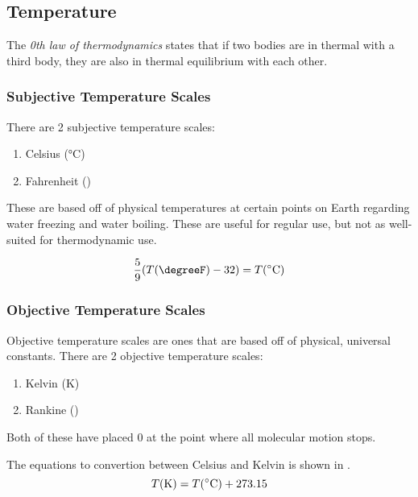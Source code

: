 \subsection{Temperature}\label{subsec:Temperature}
\begin{definition}\label{def:0_Law_Thermo}
  The \emph{0th law of thermodynamics} states that if two bodies are in thermal  with a third body, they are also in thermal equilibrium with each other.
\end{definition}

\subsubsection{Subjective Temperature Scales}\label{subsubsec:Subjective_Temp_Scales}
There are 2 subjective temperature scales:
\begin{enumerate}[noitemsep]
\item Celsius (\si{\degreeCelsius})
\item Fahrenheit (\si{\degreeF})
\end{enumerate}

These are based off of physical temperatures at certain points on Earth regarding water freezing and water boiling.
These are useful for regular use, but not as well-suited for thermodynamic use.

\begin{equation}\label{eq:Fahrenheit_Celsius}
  \frac{5}{9} (\Temp(\si{\degreeF}) - 32) = \Temp(\si{\degreeCelsius})
\end{equation}

\subsubsection{Objective Temperature Scales}\label{subsubsec:Objective_Temp_Scales}
Objective temperature scales are ones that are based off of physical, universal constants.
There are 2 objective temperature scales:
\begin{enumerate}[noitemsep]
\item Kelvin (\si{\kelvin})
\item Rankine (\si{\rankine})
\end{enumerate}

Both of these have placed $0$ at the point where all molecular motion stops.

The equations to convertion between Celsius and Kelvin is shown in .
\begin{equation}\label{eq:Celsius_Kelvin}
  \Temp(\si{\kelvin{}}) = \Temp(\si{\degreeCelsius}) + 273.15
\end{equation}


